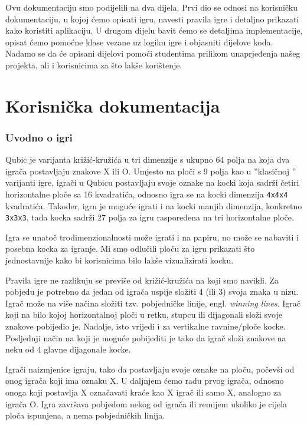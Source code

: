 \documentclass[12pt]{scrartcl}
\begin{document}
Ovu dokumentaciju smo podijelili na dva dijela. Prvi dio se odnosi na korisničku dokumentaciju, u kojoj ćemo opisati igru, navesti pravila igre i detaljno prikazati kako koristiti aplikaciju. U drugom dijelu bavit ćemo se detaljima implementacije, opisat ćemo pomoćne klase vezane uz logiku igre i objasniti dijelove koda. Nadamo se da će opisani dijelovi pomoći studentima prilikom unaprjeđenja našeg projekta, ali i korisnicima za što lakše korištenje. 




\part{Korisnička dokumentacija}
\section{Uvodno o igri}
Qubic je varijanta križić-kružića u tri dimenzije s ukupno 64 polja na koja dva igrača postavljaju znakove X ili O. Umjesto na ploči s 9 polja kao u ”klasičnoj ” varijanti igre, igrači u Qubicu postavljaju svoje oznake na kocki koja sadrži četiri horizontalne ploče sa 16 kvadratića, odnosno igra se na kocki dimenzija \texttt{4x4x4} kvadratića. Također, igru je moguće igrati i na kocki manjih dimenzija, konkretno \texttt{3x3x3}, tada kocka sadrži 27 polja za igru raspoređena na tri horizontalne ploče. 

Igra se unatoč trodimenzionalnosti može igrati i na papiru, no može se nabaviti i posebna kocka za igranje. Mi smo odlučili ploču za igru prikazati što jednostavnije kako bi korisnicima bilo lakše vizualizirati kocku. 

Pravila igre ne razlikuju se previše od križić-kružića na koji smo navikli. Za pobjedu je potrebno da jedan od igrača uspije složiti 4 (ili 3) svoja znaka u nizu. Igrač može na više načina složiti tzv. pobjedničke linije, engl. \emph{winning lines}. Igrač koji na bilo kojoj horizontalnoj ploči u retku, stupcu ili dijagonali složi svoje znakove pobijedio je. Nadalje, isto vrijedi i za vertikalne ravnine/ploče kocke. Posljednji način na koji je moguće pobijediti je tako da igrač složi znakove na neku od 4 glavne dijagonale kocke. 

Igrači naizmjenice igraju, tako da postavljaju svoje oznake na ploču, počevši od onog igrača koji ima oznaku X. U daljnjem ćemo radu prvog igrača, odnosno onoga
koji postavlja X označavati kraće kao X igrač ili samo X, analogno za igrača
O. Igra završava pobjedom nekog od igrača ili remijem ukoliko je cijela ploča
ispunjena, a nema pobjedničkih linija.
\end{document}
